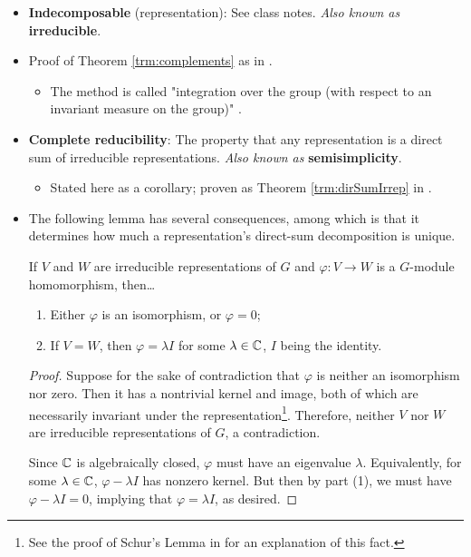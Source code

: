 \documentclass[../notes.tex]{subfiles}
\begin{document}
\begin{itemize}
    \item \textbf{Indecomposable} (representation): See class notes. \emph{Also known as} \textbf{irreducible}.
    \item Proof of Theorem \ref{trm:complements} as in \textcite{bib:Serre}.
    \begin{itemize}
        \item The method is called "integration over the group (with respect to an invariant measure on the group)" \parencite[6]{bib:FultonHarris}.
    \end{itemize}
    \item \textbf{Complete reducibility}: The property that any representation is a direct sum of irreducible representations. \emph{Also known as} \textbf{semisimplicity}.
    \begin{itemize}
        \item Stated here as a corollary; proven as Theorem \ref{trm:dirSumIrrep} in \textcite{bib:Serre}.
    \end{itemize}
    \item The following lemma has several consequences, among which is that it determines how much a representation's direct-sum decomposition is unique.
    \setcounter{FHchapter}{1}
    \setcounter{FHlemma}{6}
    \begin{FHlemma}\label{lem:Schur}
        If $V$ and $W$ are irreducible representations of $G$ and $\varphi:V\to W$ is a $G$-module homomorphism, then\dots
        \begin{enumerate}
            \item Either $\varphi$ is an isomorphism, or $\varphi=0$;
            \item If $V=W$, then $\varphi=\lambda I$ for some $\lambda\in\mathbb{C}$, $I$ being the identity.
        \end{enumerate}
        \begin{proof}
            Suppose for the sake of contradiction that $\varphi$ is neither an isomorphism nor zero. Then it has a nontrivial kernel and image, both of which are necessarily invariant under the representation\footnote{See the proof of Schur's Lemma in \textcite{bib:Serre} for an explanation of this fact.}. Therefore, neither $V$ nor $W$ are irreducible representations of $G$, a contradiction.\par
            Since $\mathbb{C}$ is algebraically closed, $\varphi$ must have an eigenvalue $\lambda$. Equivalently, for some $\lambda\in\mathbb{C}$, $\varphi-\lambda I$ has nonzero kernel. But then by part (1), we must have $\varphi-\lambda I=0$, implying that $\varphi=\lambda I$, as desired.

\end{proof}
\end{FHlemma}
\end{itemize}
\end{document}
